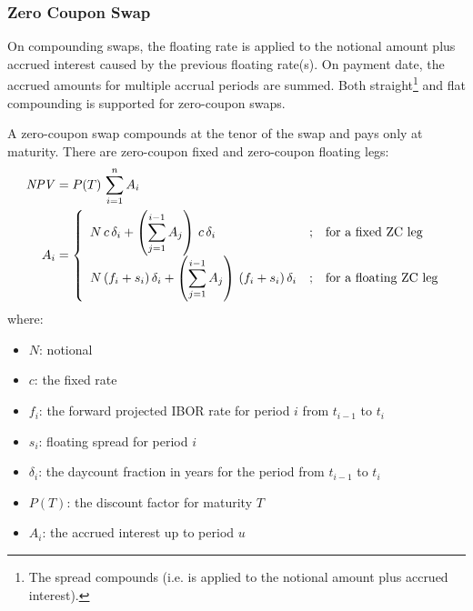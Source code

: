 \subsubsection{Zero Coupon Swap}
\label{pricing:ir_zero}

On compounding swaps, the floating rate is applied to the notional amount plus 
accrued interest caused by the previous floating rate(s). On payment date, the 
accrued amounts for multiple accrual periods are summed. Both 
straight\footnote{The spread compounds (i.e. is applied to the notional amount 
plus accrued interest).} and flat compounding is supported for zero-coupon swaps. 

\medskip
A zero-coupon swap compounds at the tenor of the swap and pays only at maturity. 
There are zero-coupon fixed and zero-coupon floating legs:
\begin{align*}
\mathit{NPV} &= P(T)\,\sum_{i=1}^n A_i \\
A_i &= \left\{\begin{array}{lcl}
\displaystyle N\,c\,\delta_i + \left(\sum_{j=1}^{i-1} A_j\right)\,c\,\delta_i 
&;& \mbox{for a fixed ZC leg} \\
\displaystyle N\,(f_i+s_i)\,\delta_i + \left(\sum_{j=1}^{i-1} A_j\right)\,(f_i+s_i)\,\delta_i 
&;& \mbox{for a floating ZC leg} \\
\end{array}
\right.
\end{align*}
where:
\begin{itemize}
\item $N$: notional
\item $c$: the fixed rate
\item $f_i$: the forward projected IBOR rate for period $i$ from $t_{i-1}$ to $t_i$ 
\item $s_i$: floating spread for period $i$ 
\item $\delta_i$: the daycount fraction in years for the period from $t_{i-1}$ to $t_i$ 
\item $P(T)$: the discount factor for maturity $T$
\item $A_i$: the accrued interest up to period $u$ 
\end{itemize}

